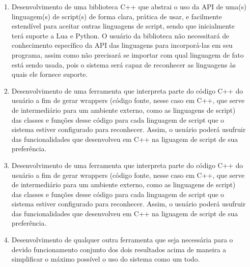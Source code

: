 \begin{enumerate}
  \item Desenvolvimento de uma biblioteca C++ que abstrai o uso da API de uma(s)
        linguagem(s) de script(s) de forma clara, prática de usar, e facilmente
        estendível para aceitar outras linguagens de script, sendo que
        inicialmente terá suporte a Lua e Python. O usuário da biblioteca não
        necessitará de conhecimento específico da API das linguagens para
        incorporá-las em seu programa, assim como não precisará se importar com
        qual linguagem de fato está sendo usada, pois o sistema será capaz de
        reconhecer as linguagens às quais ele fornece suporte.
  \item Desenvolvimento de uma ferramenta que interpreta parte do código C++ do
        usuário a fim de gerar wrappers (código fonte, nesse caso em C++, que
        serve de intermediário para um ambiente externo, como as linguagens de
        script) das classes e funções desse código para cada linguagem de script
        que o sistema estiver configurado para reconhecer. Assim, o usuário
        poderá usufruir das funcionalidades que desenvolveu em C++ na liguagem
        de script de sua preferência.
  \item Desenvolvimento de uma ferramenta que interpreta parte do código C++ do
        usuário a fim de gerar wrappers (código fonte, nesse caso em C++, que
        serve de intermediário para um ambiente externo, como as linguagens de
        script) das classes e funções desse código para cada linguagem de script
        que o sistema estiver configurado para reconhecer. Assim, o usuário
        poderá usufruir das funcionalidades que desenvolveu em C++ na liguagem
        de script de sua preferência.
  \item Desenvolvimento de qualquer outra ferramenta que seja necessária para o
        devido funcionamento conjunto dos dois resultados acima de maneira a
        simplificar o máximo possível o uso do sistema como um todo.
\end{enumerate}







